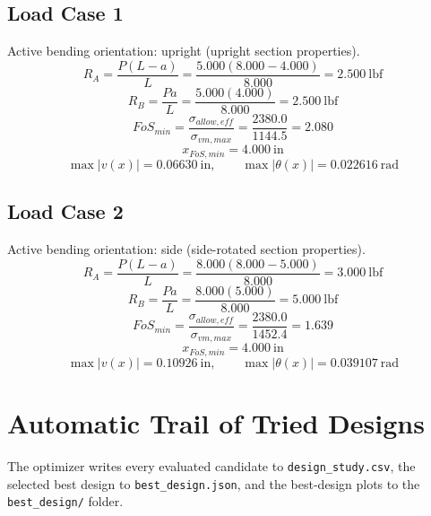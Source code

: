 \documentclass[11pt]{article}
\begin{document}
\subsection*{Load Case 1}
Active bending orientation: upright (upright section properties).
\[R_A = \frac{P(L-a)}{L} = \frac{5.000(8.000-4.000)}{8.000} = 2.500\ \mathrm{lbf}\]
\[R_B = \frac{Pa}{L} = \frac{5.000(4.000)}{8.000} = 2.500\ \mathrm{lbf}\]
\[FoS_{min} = \frac{\sigma_{allow,eff}}{\sigma_{vm,max}} = \frac{2380.0}{1144.5} = 2.080\]
\[x_{FoS,min} = 4.000\ \mathrm{in}\]
\[\max |v(x)| = 0.06630\ \mathrm{in}, \qquad \max |\theta(x)| = 0.022616\ \mathrm{rad}\]
\subsection*{Load Case 2}
Active bending orientation: side (side-rotated section properties).
\[R_A = \frac{P(L-a)}{L} = \frac{8.000(8.000-5.000)}{8.000} = 3.000\ \mathrm{lbf}\]
\[R_B = \frac{Pa}{L} = \frac{8.000(5.000)}{8.000} = 5.000\ \mathrm{lbf}\]
\[FoS_{min} = \frac{\sigma_{allow,eff}}{\sigma_{vm,max}} = \frac{2380.0}{1452.4} = 1.639\]
\[x_{FoS,min} = 4.000\ \mathrm{in}\]
\[\max |v(x)| = 0.10926\ \mathrm{in}, \qquad \max |\theta(x)| = 0.039107\ \mathrm{rad}\]

\section*{Automatic Trail of Tried Designs}
The optimizer writes every evaluated candidate to \texttt{design\_study.csv}, the selected best design to \texttt{best\_design.json}, and the best-design plots to the \texttt{best\_design/} folder.
\end{document}
